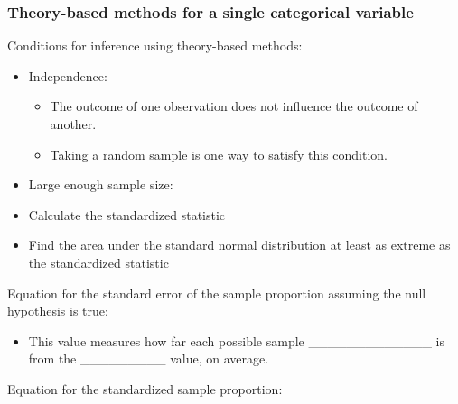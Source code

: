 \documentclass[
]{report}
\providecommand{\tightlist}{%
  \setlength{\itemsep}{0pt}\setlength{\parskip}{0pt}}
\begin{document}
\hypertarget{theory-based-methods-for-a-single-categorical-variable}{%
\subsubsection*{Theory-based methods for a single categorical variable}\label{theory-based-methods-for-a-single-categorical-variable}}

Conditions for inference using theory-based methods:

\begin{itemize}
\item
  Independence:

  \begin{itemize}
  \tightlist
  \item
    The outcome of one observation does not influence the outcome of another.
  \item
    Taking a random sample is one way to satisfy this condition.
  \end{itemize}
\item
  Large enough sample size:
\end{itemize}

\vspace{1in}

\begin{itemize}
\item
  Calculate the standardized statistic
\item
  Find the area under the standard normal distribution at least as extreme as the standardized statistic
\end{itemize}

Equation for the standard error of the sample proportion assuming the null hypothesis is true:

\vspace{0.5in}


\begin{itemize}
\tightlist
\item
  This value measures how far each possible sample \_\_\_\_\_\_\_\_\_\_\_\_\_ is from the \_\_\_\_\_\_\_\_\_ value, on average.
\end{itemize}


Equation for the standardized sample proportion:

\vspace{0.5in}
\end{document}
